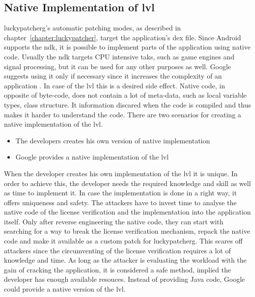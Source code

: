 \subsection{Native Implementation of \gls{lvl}} \label{subsection:counter-modifications-dynamic}

\gls{luckypatcherg}'s automatic patching modes, as described in chapter~\ref{chapter:luckypatcher}, target the application's \gls{dex} file.
Since Android supports the \gls{ndk}, it is possible to implement parts of the application using native code.
\newline
Usually the \gls{ndk} targets CPU intensive taks, such as game engines and signal processing, but it can be used for any other purposes as well.
Google suggests using it only if necessary since it increases the complexity of an application \cite{androidNdk}.
In case of the \gls{lvl} this is a desired side effect.
Native code, in opposite of byte-code, does not contain a lot of meta-data, such as local variable types, class structure.
It information discared when the code is compiled and thus makes it harder to understand the code.
\newline
There are two scenarios for creating a native implementation of the \gls{lvl}.
\begin{itemize}
  \item The developers creates his own version of native implementation
  \item Google provides a native implementation of the \gls{lvl}
\end{itemize}
When the developer creates his own implementation of the \gls{lvl} it is unique.
In order to achieve this, the developer needs the required knowledge and skill as well as time to implement it.
In case the implementation is done in a  right way, it offers uniqueness and safety.
The attackers have to invest time to analyse the native code of the license verification and the implementation into the application itself.
Only after reverse engineering the native code, they can start with searching for a way to break the license verification mechanism, repack the native code and make it available as a custom patch for \gls{luckypatcherg}.
This scares off attackers since the circumventing of the license verification requires a lot of knowledge and time.
As long as the attacker is evaluating the workload with the gain of cracking the application, it is considered a safe method, implied the developer has enough available resouces. \cite{munteanLicense}
\newline
Instead of providing Java code, Google could provide a native version of the \gls{lvl}.
